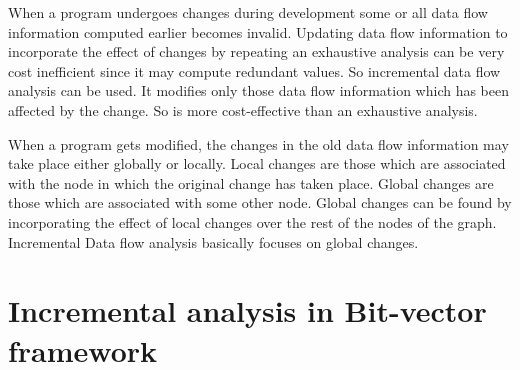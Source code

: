 \documentclass[11pt,a4paper,openright]{report}
\begin{document}
When a program undergoes changes during development some or all data flow information computed earlier becomes invalid. 
Updating data flow information to incorporate the effect of changes by repeating an exhaustive analysis can be very cost inefficient since
it may compute redundant values. So incremental data flow analysis can be used. It modifies only those data flow information which has been
affected by the change. So is more cost-effective than an exhaustive analysis.

When a program gets modified, the changes in the old data flow information may take place either globally or locally. Local changes
are those which are associated with the node in which the original change has taken place. Global changes are those which are associated with some
other node. Global changes can be found by incorporating the effect of local changes over the rest of the nodes of the graph. Incremental Data flow
analysis basically focuses on global changes.


\section{Incremental analysis in Bit-vector framework}
\end{document}
